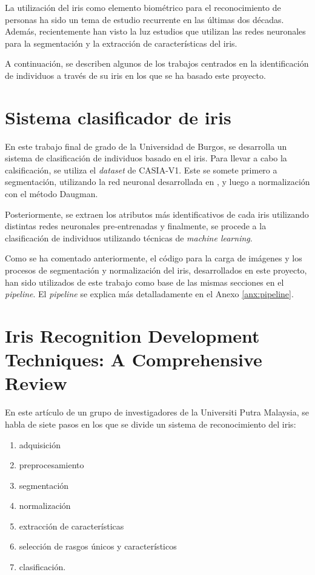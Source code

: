  \label{capitulo6}

La utilización del iris como elemento biométrico para el reconocimiento de personas ha sido un tema de estudio recurrente en las últimas dos décadas.
Además, recientemente han visto la luz estudios que utilizan las redes neuronales para la segmentación y la extracción de características del iris.

A continuación, se describen algunos de los trabajos centrados en la identificación de individuos a través de su iris en los que se ha basado este proyecto.

\section{Sistema clasificador de iris}

En este trabajo final de grado \cite{tfg_iris_2020} de la Universidad de Burgos, se desarrolla un sistema de clasificación  de individuos basado en el iris. Para llevar a cabo la calsificación, se utiliza el \textit{dataset} 
de CASIA-V1. Este se somete primero a segmentación, utilizando la red neuronal desarrollada en \cite{lozej_end--end_2018}, y luego a normalización con el método Daugman. 

Posteriormente, se extraen los atributos más identificativos de cada iris utilizando distintas redes neuronales pre-entrenadas y finalmente, se procede a la clasificación de individuos utilizando técnicas de \textit{machine learning}.

Como se ha comentado anteriormente, el código para la carga de imágenes y los procesos de segmentación y normalización del iris, desarrollados en este proyecto, han sido utilizados de este trabajo como 
base de las mismas secciones en el \textit{pipeline}. El \textit{pipeline} se explica más detalladamente en el Anexo \ref{anx:pipeline}.

\section{Iris Recognition Development Techniques: A Comprehensive Review}

En este artículo \cite{malgheet_iris_2021} de un grupo de investigadores de la Universiti Putra Malaysia, se habla de siete pasos en los que se divide un sistema de reconocimiento del iris:
\begin{enumerate}
\item adquisición
\item preprocesamiento
\item segmentación
\item normalización
\item extracción de características
\item selección de rasgos únicos y característicos
\item clasificación. 
\end{enumerate}
 
